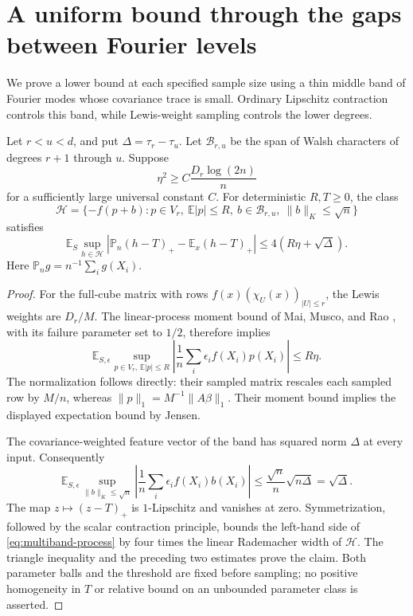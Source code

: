 \section{A uniform bound through the gaps between Fourier levels}
We prove a lower bound at each specified sample size using a thin middle band
of Fourier modes whose covariance trace is small. Ordinary Lipschitz
contraction controls this band, while Lewis-weight sampling controls
the lower degrees.

\begin{lemma}\label{lem:multiband-process}
Let $r<u<d$, and put $\Delta=\tau_r-\tau_u$. Let
$\mathcal B_{r,u}$ be the span of Walsh characters of degrees $r+1$
through $u$. Suppose
\[
 \eta^2\ge C\frac{D_r\log(2n)}n
\]
for a sufficiently large universal constant $C$. For deterministic
$R,T\ge0$, the class
\[
 \mathcal H=\{-f(p+b):p\in V_r,\ \mathbb E|p|\le R,
                 \ b\in\mathcal B_{r,u},\ \|b\|_K\le\sqrt n\}
\]
satisfies
\begin{equation}\label{eq:multiband-process}
 \mathbb E_S\sup_{h\in\mathcal H}
   |\mathbb P_n(h-T)_+-\mathbb E_x(h-T)_+|
 \le4(R\eta+\sqrt\Delta).
\end{equation}
Here $\mathbb P_n g=n^{-1}\sum_i g(X_i)$.
\end{lemma}
\begin{proof}
For the full-cube matrix with rows $f(x)(\chi_U(x))_{|U|\le r}$,
the Lewis weights are $D_r/M$. The linear-process moment bound of
Mai, Musco, and Rao \cite[Theorem 3]{mai2021coresets}, with its failure
parameter set to $1/2$, therefore implies
\[
 \mathbb E_{S,\epsilon}\sup_{p\in V_r,\,\mathbb E|p|\le R}
 \left|\frac1n\sum_i\epsilon_i f(X_i)p(X_i)\right|\le R\eta.
\]
The normalization follows directly: their sampled matrix rescales each
sampled row by $M/n$, whereas $\|p\|_1=M^{-1}\|A\beta\|_1$.
Their moment bound implies the displayed expectation bound by Jensen.

The covariance-weighted feature vector of the band has squared norm
$\Delta$ at every input. Consequently
\[
 \mathbb E_{S,\epsilon}\sup_{\|b\|_K\le\sqrt n}
 \left|\frac1n\sum_i\epsilon_i f(X_i)b(X_i)\right|
 \le\frac{\sqrt n}{n}\sqrt{n\Delta}=\sqrt\Delta.
\]
The map $z\mapsto(z-T)_+$ is $1$-Lipschitz and vanishes at zero.
Symmetrization, followed by the scalar contraction principle, bounds
the left-hand side of \eqref{eq:multiband-process} by four times the
linear Rademacher width of $\mathcal H$. The triangle inequality and
the preceding two estimates prove the claim. Both parameter balls and
the threshold are fixed before sampling; no positive homogeneity in
$T$ or relative bound on an unbounded parameter class is asserted.
\end{proof}

